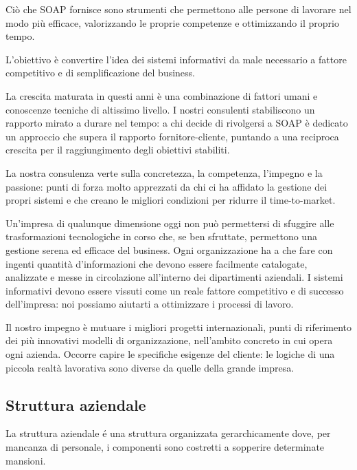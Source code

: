 \documentclass[../../documentazione.tex]{subfiles}
\begin{document}
    Ciò che SOAP fornisce sono strumenti che permettono alle persone di lavorare nel modo più efficace,
    valorizzando le proprie competenze e ottimizzando il proprio tempo.

    L'obiettivo è convertire l'idea dei sistemi informativi da male necessario a fattore competitivo e di semplificazione del business.

    La crescita maturata in questi anni è una combinazione di fattori umani e conoscenze tecniche di altissimo livello.
    I nostri consulenti stabiliscono un rapporto mirato a durare nel tempo: a chi decide di rivolgersi a SOAP è dedicato
    un approccio che supera il rapporto fornitore-cliente, puntando a una reciproca crescita per il raggiungimento degli obiettivi stabiliti.

    La nostra consulenza verte sulla concretezza, la competenza, l'impegno e la passione:
    punti di forza molto apprezzati da chi ci ha affidato la gestione dei propri sistemi e che creano le migliori condizioni
    per ridurre il time-to-market.

    Un'impresa di qualunque dimensione oggi non può permettersi di sfuggire alle trasformazioni tecnologiche in corso che,
    se ben sfruttate, permettono una gestione serena ed efficace del business.
    Ogni organizzazione ha a che fare con ingenti quantità d'informazioni che devono essere facilmente catalogate,
    analizzate e messe in circolazione all'interno dei dipartimenti aziendali.
    I sistemi informativi devono essere vissuti come un reale fattore competitivo e di successo dell'impresa:
    noi possiamo aiutarti a ottimizzare i processi di lavoro.

    Il nostro impegno è mutuare i migliori progetti internazionali, punti di riferimento dei più innovativi modelli di organizzazione,
    nell'ambito concreto in cui opera ogni azienda. Occorre capire le specifiche esigenze del cliente:
    le logiche di una piccola realtà lavorativa sono diverse da quelle della grande impresa.

    \subsection{Struttura aziendale}\label{subsec:struttura-aziendale}
    La struttura aziendale é una struttura organizzata gerarchicamente dove, per mancanza di personale, i componenti sono
    costretti a sopperire determinate mansioni.
\end{document}
